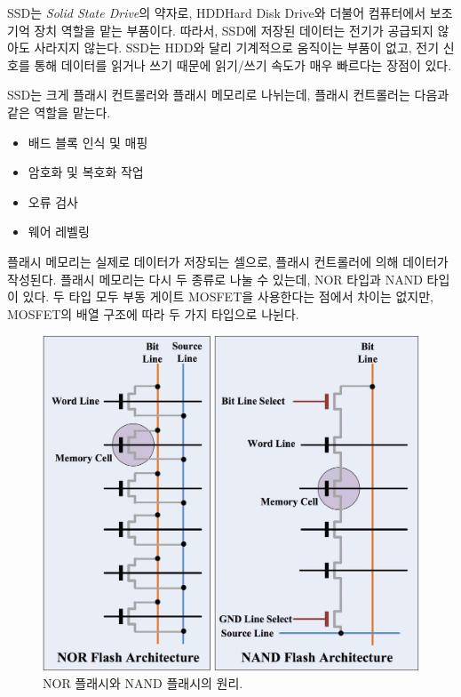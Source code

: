 \documentclass{homework}
\begin{document}
\maketitle


SSD는 \textit{Solid State Drive}의 약자로, HDD{\footnotesize  Hard Disk Drive}와 더불어 컴퓨터에서 보조 기억 장치 역할을 맡는 부품이다. 따라서, SSD에 저장된 데이터는 전기가 공급되지 않아도 사라지지 않는다. SSD는 HDD와 달리 기계적으로 움직이는 부품이 없고, 전기 신호를 통해 데이터를 읽거나 쓰기 때문에 읽기/쓰기 속도가 매우 빠르다는 장점이 있다.

SSD는 크게 플래시 컨트롤러와 플래시 메모리로 나뉘는데, 플래시 컨트롤러는 다음과 같은 역할을 맡는다.

\begin{itemize}
    \item 배드 블록 인식 및 매핑
    \item 암호화 및 복호화 작업
    \item 오류 검사
    \item 웨어 레벨링
\end{itemize}

플래시 메모리는 실제로 데이터가 저장되는 셀으로, 플래시 컨트롤러에 의해 데이터가 작성된다. 플래시 메모리는 다시 두 종류로 나눌 수 있는데, NOR 타입과 NAND 타입이 있다. 두 타입 모두 부동 게이트 MOSFET을 사용한다는 점에서 차이는 없지만, MOSFET의 배열 구조에 따라 두 가지 타입으로 나뉜다.

\begin{figure}[ht]
    \centering
    \includegraphics[width=0.8\linewidth]{res/nor-vs-nand-flash.jpg}
    \caption{NOR 플래시와 NAND 플래시의 원리.}
    \label{fig:nor-vs-nand-flash}
\end{figure}
\end{document}
